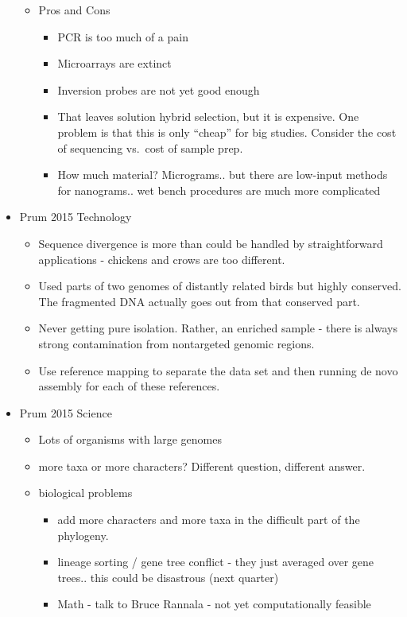 \documentclass{article}
\begin{document}
\begin{itemize}
\begin{itemize}
\begin{itemize}
            \end{itemize}
            \item Pros and Cons
            \begin{itemize}
                \item PCR is too much of a pain
                \item Microarrays are extinct
                \item Inversion probes are not yet good enough
                \item That leaves solution hybrid selection, but it is expensive.  One problem is that this is only ``cheap'' for big studies.  Consider the cost of sequencing vs.~cost of sample prep.
                \item How much material?  Micrograms.. but there are low-input methods for nanograms.. wet bench procedures are much more complicated
            \end{itemize}
        \end{itemize}
        \item Prum 2015 Technology
        \begin{itemize}
            \item Sequence divergence is more than could be handled by straightforward applications - chickens and crows are too different.
            \item Used parts of two genomes of distantly related birds but highly conserved.  The fragmented DNA actually goes out from that conserved part.
            \item Never getting pure isolation.  Rather, an enriched sample - there is always strong contamination from nontargeted genomic regions.
            \item Use reference mapping to separate the data set and then running de novo assembly for each of these references.
        \end{itemize}
        \item Prum 2015 Science
        \begin{itemize}
            \item Lots of organisms with large genomes
            \item more taxa or more characters?  Different question, different answer.
            \item biological problems
            \begin{itemize}
                \item add more characters and more taxa in the difficult part of the phylogeny.
                \item lineage sorting / gene tree conflict - they just averaged over gene trees.. this could be disastrous (next quarter)
                \item Math - talk to Bruce Rannala - not yet computationally feasible
            \end{itemize}
        \end{itemize}
    \end{itemize}
\end{document}
